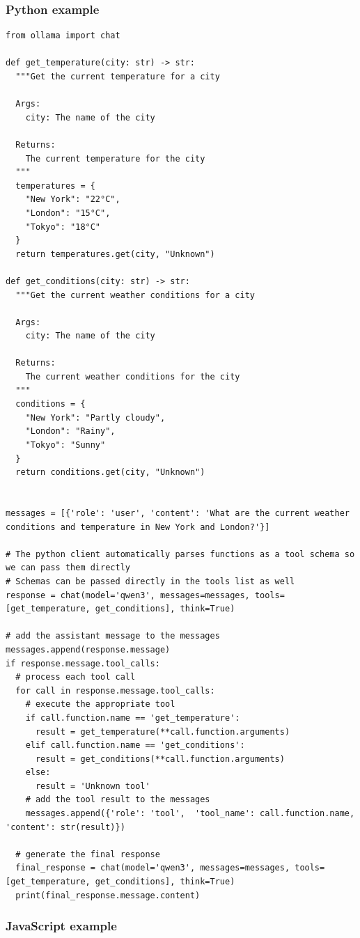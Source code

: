 \documentclass[12pt,UTF8]{ctexbook}
\begin{document}
\subsubsection{Python example}
\begin{verbatim}
from ollama import chat

def get_temperature(city: str) -> str:
  """Get the current temperature for a city
  
  Args:
    city: The name of the city

  Returns:
    The current temperature for the city
  """
  temperatures = {
    "New York": "22°C",
    "London": "15°C",
    "Tokyo": "18°C"
  }
  return temperatures.get(city, "Unknown")

def get_conditions(city: str) -> str:
  """Get the current weather conditions for a city
  
  Args:
    city: The name of the city

  Returns:
    The current weather conditions for the city
  """
  conditions = {
    "New York": "Partly cloudy",
    "London": "Rainy",
    "Tokyo": "Sunny"
  }
  return conditions.get(city, "Unknown")


messages = [{'role': 'user', 'content': 'What are the current weather conditions and temperature in New York and London?'}]

# The python client automatically parses functions as a tool schema so we can pass them directly
# Schemas can be passed directly in the tools list as well
response = chat(model='qwen3', messages=messages, tools=[get_temperature, get_conditions], think=True)

# add the assistant message to the messages
messages.append(response.message)
if response.message.tool_calls:
  # process each tool call
  for call in response.message.tool_calls:
    # execute the appropriate tool
    if call.function.name == 'get_temperature':
      result = get_temperature(**call.function.arguments)
    elif call.function.name == 'get_conditions':
      result = get_conditions(**call.function.arguments)
    else:
      result = 'Unknown tool'
    # add the tool result to the messages
    messages.append({'role': 'tool',  'tool_name': call.function.name, 'content': str(result)})

  # generate the final response
  final_response = chat(model='qwen3', messages=messages, tools=[get_temperature, get_conditions], think=True)
  print(final_response.message.content)
\end{verbatim}

\subsubsection{JavaScript example}
\end{document}
